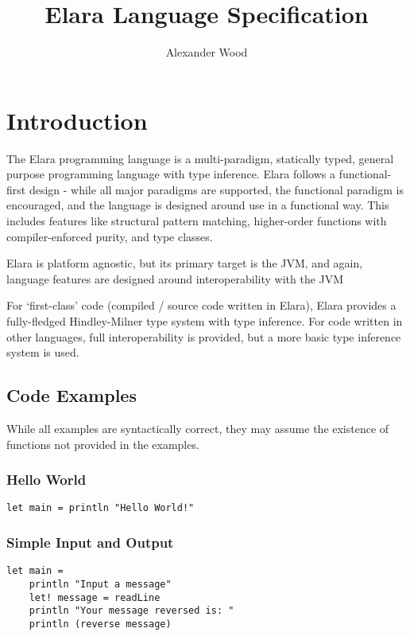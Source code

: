 \documentclass{article}
\title{Elara Language Specification}
\author{Alexander Wood}
\begin{document}
\maketitle
\tableofcontents

\section{Introduction}

The Elara programming language is a multi-paradigm, statically typed, general purpose
programming language with type inference.
Elara follows a functional-first design - while all major paradigms are supported,
the functional paradigm is encouraged, and the language is designed around use in a functional way.
This includes features like structural pattern matching, higher-order functions with compiler-enforced purity,
and type classes.

Elara is platform agnostic, but its primary target is the JVM, and again, language features are designed
around interoperability with the JVM\@

For `first-class' code (compiled / source code written in Elara), Elara provides a fully-fledged Hindley-Milner
type system with type inference.
For code written in other languages, full interoperability is provided, but a more basic type inference system
is used.

\subsection{Code Examples}
While all examples are syntactically correct, they may assume the existence of functions not provided in the examples.

\subsubsection{Hello World}
\begin{verbatim}
let main = println "Hello World!"
\end{verbatim}

\subsubsection{Simple Input and Output}
\begin{verbatim}
let main =
    println "Input a message"
    let! message = readLine
    println "Your message reversed is: "
    println (reverse message)
\end{verbatim}
\end{document}
